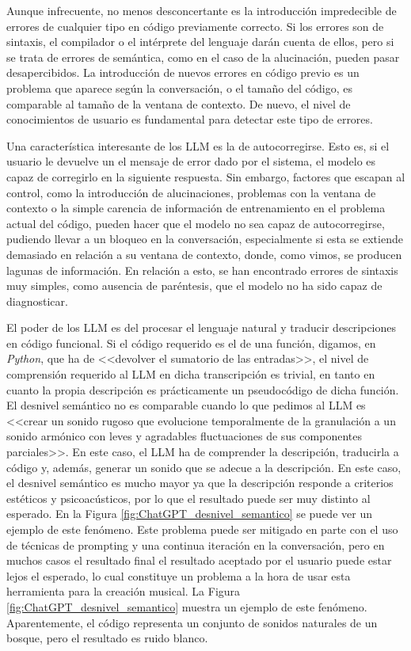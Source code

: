 Aunque infrecuente, no menos desconcertante es la introducción impredecible de errores de cualquier tipo en código previamente correcto. Si los errores son de sintaxis, el compilador o el intérprete del lenguaje darán cuenta de ellos, pero si se trata de errores de semántica, como en el caso de la alucinación, pueden pasar desapercibidos. La introducción de nuevos errores en código previo es un problema que aparece según la conversación, o el tamaño del código, es comparable al tamaño de la ventana de contexto. De nuevo, el nivel de conocimientos de usuario es fundamental para detectar este tipo de errores.

Una característica interesante de los LLM es la de autocorregirse. Esto es, si el usuario le devuelve un el mensaje de error dado por el sistema, el modelo es capaz de corregirlo en la siguiente respuesta. Sin embargo, factores que escapan al control, como la introducción de alucinaciones, problemas con la ventana de contexto o la simple carencia de información de entrenamiento en el problema actual del código, pueden hacer que el modelo no sea capaz de autocorregirse, pudiendo llevar a un bloqueo en la conversación, especialmente si esta se extiende demasiado en relación a su ventana de contexto, donde, como vimos, se producen lagunas de información. En relación a esto, se han encontrado errores de sintaxis muy simples, como ausencia de paréntesis, que el modelo no ha sido capaz de diagnosticar.

El poder de los LLM es del procesar el lenguaje natural y traducir descripciones en código funcional. Si el código requerido es el de una función, digamos, en \textit{Python}, que ha de <<devolver el sumatorio de las entradas>>, el nivel de comprensión requerido al LLM en dicha transcripción es trivial, en tanto en cuanto la propia descripción es prácticamente un pseudocódigo de dicha función. El desnivel semántico no es comparable cuando lo que pedimos al LLM es <<crear un sonido rugoso que evolucione temporalmente de la granulación a un sonido armónico con leves y agradables fluctuaciones de sus componentes parciales>>. En este caso, el LLM ha de comprender la descripción, traducirla a código y, además, generar un sonido que se adecue a la descripción.  En este caso, el desnivel semántico es mucho mayor ya que la descripción responde a criterios estéticos y psicoacústicos, por lo que el resultado puede ser muy distinto al esperado. En la Figura \ref{fig:ChatGPT_desnivel_semantico} se puede ver un ejemplo de este fenómeno. Este problema puede ser mitigado en parte con el uso de técnicas de prompting y una continua iteración en la conversación, pero en muchos casos el resultado final el resultado aceptado por el usuario puede estar lejos el esperado, lo cual constituye un problema a la hora de usar esta herramienta para la creación musical. La Figura \ref{fig:ChatGPT_desnivel_semantico} muestra un ejemplo de este fenómeno. Aparentemente, el código representa un conjunto de sonidos naturales de un bosque, pero el resultado es ruido blanco. 

